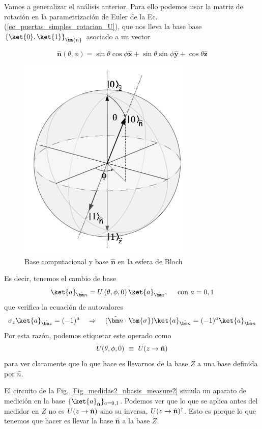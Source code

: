 \documentclass[a4paper,11pt]{book} %
\numberwithin{equation}{chapter}
\def\lp{\left(}
\def\rp{\right)}
\def\lch{\left\{}
\def\rch{\right\}}
\def\rqa{\quad \Rightarrow \quad}
\begin{document}
Vamos a generalizar el análisis anterior. Para ello podemos usar la matriz de rotación en la parametrización de Euler de la Ec. (\ref{ec_puertas_simples_rotacion_U}), que nos lleva la base base  $\lch \ket{0}, \ket{1} \rch_{\hat{\bm{n}}}$ asociado a un vector

\begin{equation}
\hat{\bm n} (\theta, \phi) = \sin \theta \cos \phi \hat{\bm x} + \sin \theta  \sin \phi \hat{\bm y} + \cos \theta \hat{\bm z}
\end{equation}

	\begin{figure}[H]
	\centering 
	\includegraphics[width=0.3\linewidth]{Figuras/Fig_medidas1_BlochSphere_basis.png}
	\caption{Base computacional y base $\hat{\bm n}$ en la esfera de Bloch}
	\label{Fig_medidas1_BlochSphere_basis}
	\end{figure}

Es decir, tenemos el cambio de base
	\begin{equation}
	\ket{a}_{\hat{\bm n}} = U \lp \theta, \phi, 0 \rp \ket{a}_{\hat{\bm z}}, ~~~~ \text{con } a= 0,1 
	\end{equation}
que verifica la ecuación de autovalores
	\begin{equation}
	\sigma_z \ket{a}_{\hat{\bm z}} = (-1)^a \rqa (\hat{\bm n} \cdot \bm{\sigma} ) \ket{a}_{\hat{\bm n}} = (-1)^a \ket{a}_{\hat{\bm n}}
	\end{equation}
Por esta razón, podemos etiquetar este operado como
	\begin{equation}
	U(\theta,\phi,0) ~ \equiv ~ U(z\to \hat{\bf n})
	\end{equation}
para ver claramente que lo que hace es llevarnos de la base $Z$ a una base definida por $\hat{n}$.

El circuito de la Fig. \ref{Fig_medidas2_nbasis_measure2}  simula un aparato de medición en la base $\{\ket{a}_{\hat{\bf n}}\}_{a=0,1}$. Podemos ver que lo que se aplica antes del medidor en $Z$ no es $U(z\to \hat{\bf n})$ sino su inversa, $U(z\to \hat{\bf n})^\dagger$. Esto es porque lo que tenemos que hacer es llevar la base $\hat{\bm n}$ a la base $Z$.
\end{document}
